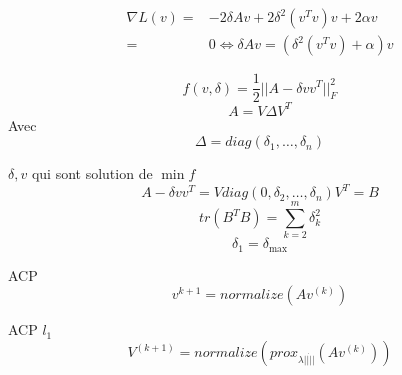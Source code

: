 \documentclass{article}
\begin{document}
\begin{equation}
\begin{split}
\nabla L(v)=&-2\delta Av+2\delta^2(v^Tv)v+2\alpha v\\
=&0 \Leftrightarrow \delta Av=(\delta^2(v^Tv)+\alpha)v
\end{split}
\end{equation}

\begin{equation}
f(v,\delta)=\frac{1}{2}||A-\delta vv^T||_F^2
\end{equation}
\begin{equation}
A=V\Delta V^T
\end{equation}
Avec 
\begin{equation}
\Delta=diag(\delta_1,\ldots,\delta_n)
\end{equation}

$\delta, v$ qui sont solution de $\min f$
\begin{equation}
A-\delta vv^T=Vdiag(0,\delta_2,\ldots,\delta_n)V^T=B
\end{equation}
\begin{equation}
tr(B^TB)=\sum_{k=2}^m\delta_k^2
\end{equation}
\begin{equation}
\delta_1=\delta_{\max}
\end{equation}

ACP
\begin{equation}
v^{k+1}=normalize(Av^{(k)})
\end{equation}

ACP $l_1$
\begin{equation}
V^{(k+1)}=normalize(prox_{\lambda||\dot||}(Av^{(k)}))
\end{equation}
\end{document}
